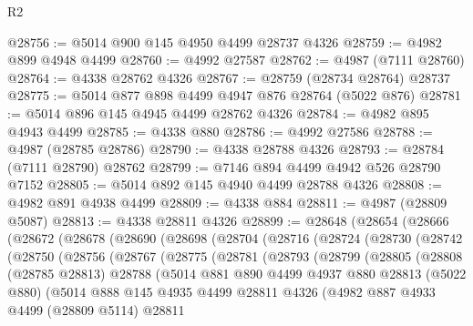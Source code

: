 \begin{lexlean}{R2}
\begin{coremodule}
@28756 := @5014 @900 @145 @4950 @4499 @28737 @4326
@28759 := @4982 @899 @4948 @4499
@28760 := @4992 @27587
@28762 := @4987 (@7111 @28760)
@28764 := @4338 @28762 @4326
@28767 := @28759 (@28734 @28764) @28737
@28775 := @5014 @877 @898 @4499 @4947 @876 @28764 (@5022 @876)
@28781 := @5014 @896 @145 @4945 @4499 @28762 @4326
@28784 := @4982 @895 @4943 @4499
@28785 := @4338 @880
@28786 := @4992 @27586
@28788 := @4987 (@28785 @28786)
@28790 := @4338 @28788 @4326
@28793 := @28784 (@7111 @28790) @28762
@28799 := @7146 @894 @4499 @4942 @526 @28790 @7152
@28805 := @5014 @892 @145 @4940 @4499 @28788 @4326
@28808 := @4982 @891 @4938 @4499
@28809 := @4338 @884
@28811 := @4987 (@28809 @5087)
@28813 := @4338 @28811 @4326
@28899 := @28648
    (@28654
      (@28666
        (@28672
          (@28678
            (@28690
              (@28698
                (@28704
                  (@28716
                    (@28724
                      (@28730
                        (@28742
                          (@28750
                            (@28756
                              (@28767
                                (@28775
                                  (@28781
                                    (@28793
                                      (@28799
                                        (@28805
                                          (@28808
                                            (@28785 @28813)
                                            @28788
                                            (@5014
                                              @881
                                              @890
                                              @4499
                                              @4937
                                              @880
                                              @28813
                                              (@5022 @880)
                                              (@5014
                                                @888
                                                @145
                                                @4935
                                                @4499
                                                @28811
                                                @4326
                                                (@4982
                                                  @887
                                                  @4933
                                                  @4499
                                                  (@28809 @5114)
                                                  @28811

\end{coremodule}
\end{lexlean}
